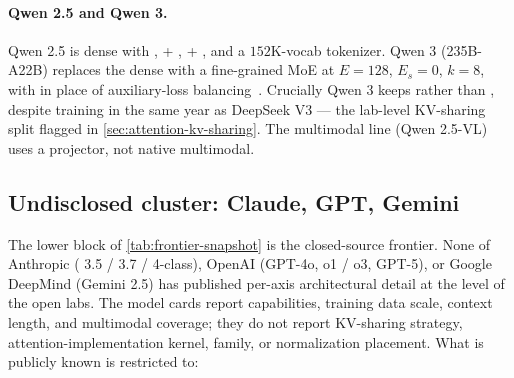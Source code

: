 \paragraph{Qwen 2.5 and Qwen 3.}
Qwen 2.5 is dense  with ,  + ,  + , and
a $152$K-vocab  tokenizer. Qwen 3 (235B-A22B) replaces the dense  with
a fine-grained MoE at $E = 128$, $E_s = 0$, $k = 8$, with
 in place of auxiliary-loss
balancing~\citep[\S 2.1]{qwen3}. Crucially Qwen 3 keeps  rather
than , despite training in the same year as DeepSeek V3 --- the
lab-level KV-sharing split flagged in
\cref{sec:attention-kv-sharing}. The multimodal line (Qwen 2.5-VL)
uses a projector, not native multimodal.

\subsection{Undisclosed cluster: Claude, GPT, Gemini}
\label{sec:snapshot-undisclosed}

The lower block of \cref{tab:frontier-snapshot} is the closed-source
frontier. None of Anthropic ( 3.5 / 3.7 / 4-class), OpenAI
(GPT-4o, o1 / o3, GPT-5), or Google DeepMind (Gemini 2.5) has
published per-axis architectural detail at the level of the open
labs. The model cards report capabilities, training data scale,
context length, and multimodal coverage; they do not report
KV-sharing strategy, attention-implementation kernel,  family, or
normalization placement. What is publicly known is restricted to:

